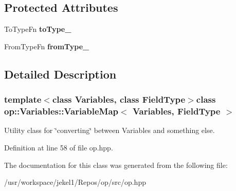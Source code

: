 \subsection*{Protected Attributes}
\begin{DoxyCompactItemize}
\item 
\hypertarget{classop_1_1Variables_1_1VariableMap_ac9cfaff2e29e86c3bc4f6d9332ce9df7}{To\-Type\-Fn {\bfseries to\-Type\-\_\-}}\label{classop_1_1Variables_1_1VariableMap_ac9cfaff2e29e86c3bc4f6d9332ce9df7}

\item 
\hypertarget{classop_1_1Variables_1_1VariableMap_ab886321b3d16a4486f940eb7b7753bf4}{From\-Type\-Fn {\bfseries from\-Type\-\_\-}}\label{classop_1_1Variables_1_1VariableMap_ab886321b3d16a4486f940eb7b7753bf4}

\end{DoxyCompactItemize}


\subsection{Detailed Description}
\subsubsection*{template$<$class Variables, class Field\-Type$>$class op\-::\-Variables\-::\-Variable\-Map$<$ Variables, Field\-Type $>$}

Utility class for \char`\"{}converting\char`\"{} between Variables and something else. 

Definition at line 58 of file op.\-hpp.



The documentation for this class was generated from the following file\-:\begin{DoxyCompactItemize}
\item 
/usr/workspace/jekel1/\-Repos/op/src/op.\-hpp\end{DoxyCompactItemize}
